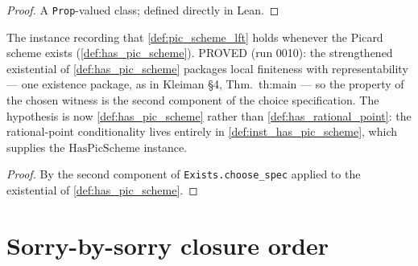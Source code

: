 \begin{proof}\leanok
  A \texttt{Prop}-valued class; defined directly in Lean.
\end{proof}

\begin{definition}
  \label{def:inst_pic_scheme_lft}
  The instance recording that \cref{def:pic_scheme_lft} holds whenever the
  Picard scheme exists (\cref{def:has_pic_scheme}). PROVED (run 0010): the
  strengthened existential of \cref{def:has_pic_scheme} packages local
  finiteness with representability --- one existence package, as in Kleiman
  \S 4, Thm.~th:main --- so the property of the chosen witness is the
  second component of the choice specification. The hypothesis is now
  \cref{def:has_pic_scheme} rather than \cref{def:has_rational_point}: the
  rational-point conditionality lives entirely in
  \cref{def:inst_has_pic_scheme}, which supplies the
  \(\mathrm{HasPicScheme}\) instance.
\end{definition}

\begin{proof}\leanok
  By the second component of \texttt{Exists.choose\_spec} applied to the
  existential of \cref{def:has_pic_scheme}.
\end{proof}

\section{Sorry-by-sorry closure order}
\label{sec:fga_pic_sorry_closure_order}


